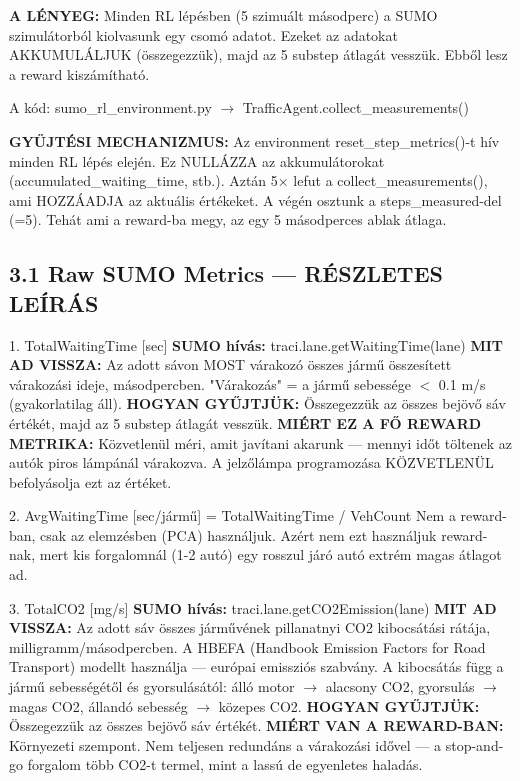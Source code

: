 \documentclass[11pt,a4paper]{article}
\begin{document}
\textbf{A LÉNYEG:}
Minden RL lépésben (5 szimuált másodperc) a SUMO szimulátorból
kiolvasunk egy csomó adatot. Ezeket az adatokat AKKUMULÁLJUK
(összegezzük), majd az 5 substep átlagát vesszük. Ebből lesz
a reward kiszámítható.

A kód: sumo\_rl\_environment.py $\rightarrow$ TrafficAgent.collect\_measurements()

\textbf{GYŰJTÉSI MECHANIZMUS:}
Az environment reset\_step\_metrics()-t hív minden RL lépés elején.
Ez NULLÁZZA az akkumulátorokat (accumulated\_waiting\_time, stb.).
Aztán 5× lefut a collect\_measurements(), ami HOZZÁADJA az
aktuális értékeket. A végén osztunk a steps\_measured-del (=5).
Tehát ami a reward-ba megy, az egy 5 másodperces ablak átlaga.

\subsection*{3.1 Raw SUMO Metrics — RÉSZLETES LEÍRÁS}

1. TotalWaitingTime [sec]
\textbf{SUMO hívás:} traci.lane.getWaitingTime(lane)
\textbf{MIT AD VISSZA:} Az adott sávon MOST várakozó összes jármű
összesített várakozási ideje, másodpercben.
"Várakozás" = a jármű sebessége $<$ 0.1 m/s (gyakorlatilag áll).
\textbf{HOGYAN GYŰJTJÜK:} Összegezzük az összes bejövő sáv értékét,
majd az 5 substep átlagát vesszük.
\textbf{MIÉRT EZ A FŐ REWARD METRIKA:} Közvetlenül méri, amit
javítani akarunk — mennyi időt töltenek az autók piros
lámpánál várakozva. A jelzőlámpa programozása KÖZVETLENÜL
befolyásolja ezt az értéket.

2. AvgWaitingTime [sec/jármű]
= TotalWaitingTime / VehCount
Nem a reward-ban, csak az elemzésben (PCA) használjuk.
Azért nem ezt használjuk reward-nak, mert kis forgalomnál
(1-2 autó) egy rosszul járó autó extrém magas átlagot ad.

3. TotalCO2 [mg/s]
\textbf{SUMO hívás:} traci.lane.getCO2Emission(lane)
\textbf{MIT AD VISSZA:} Az adott sáv összes járművének pillanatnyi
CO2 kibocsátási rátája, milligramm/másodpercben.
A HBEFA (Handbook Emission Factors for Road Transport)
modellt használja — európai emissziós szabvány.
A kibocsátás függ a jármű sebességétől és gyorsulásától:
álló motor $\rightarrow$ alacsony CO2, gyorsulás $\rightarrow$ magas CO2,
állandó sebesség $\rightarrow$ közepes CO2.
\textbf{HOGYAN GYŰJTJÜK:} Összegezzük az összes bejövő sáv értékét.
\textbf{MIÉRT VAN A REWARD-BAN:} Környezeti szempont. Nem teljesen
redundáns a várakozási idővel — a stop-and-go forgalom
több CO2-t termel, mint a lassú de egyenletes haladás.
\end{document}
